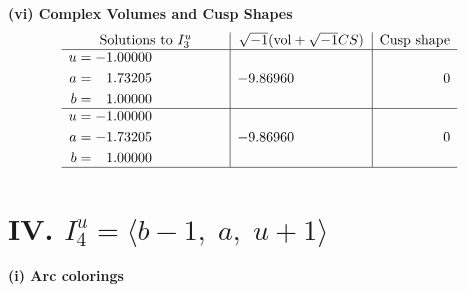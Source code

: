 \documentclass[1p]{elsarticle_modified}
\theoremstyle{definition}
\newcommand{\I}{\sqrt{-1}}
\begin{document}
\newpage\flushleft \textbf{(vi) Complex Volumes and Cusp Shapes}
$$\begin{array}{c|c|c}  
\text{Solutions to }I^u_{3}& \I (\text{vol} + \sqrt{-1}CS) & \text{Cusp shape}\\
 \hline 
\begin{aligned}
u &= -1.00000\phantom{ +0.000000I} \\
a &= \phantom{-}1.73205\phantom{ +0.000000I} \\
b &= \phantom{-}1.00000\phantom{ +0.000000I}\end{aligned}
 & -9.86960\phantom{ +0.000000I} & \phantom{-0.000000 } 0 \\ \hline\begin{aligned}
u &= -1.00000\phantom{ +0.000000I} \\
a &= -1.73205\phantom{ +0.000000I} \\
b &= \phantom{-}1.00000\phantom{ +0.000000I}\end{aligned}
 & -9.86960\phantom{ +0.000000I} & \phantom{-0.000000 } 0\\
 \hline 
 \end{array}$$\newpage\newpage\renewcommand{\arraystretch}{1}
\centering \section*{IV. $I^u_{4}= \langle b-1,\;a,\;u+1 \rangle$}
\flushleft \textbf{(i) Arc colorings}\\
\end{document}
